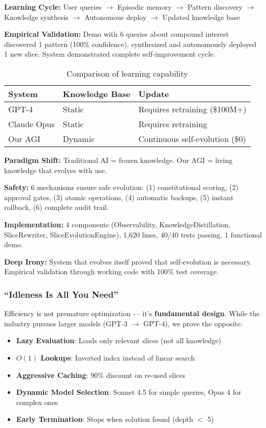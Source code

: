 \documentclass[11pt]{article}
\begin{document}
\textbf{Learning Cycle:} User queries $\rightarrow$ Episodic memory $\rightarrow$ Pattern discovery $\rightarrow$ Knowledge synthesis $\rightarrow$ Autonomous deploy $\rightarrow$ Updated knowledge base

\textbf{Empirical Validation:} Demo with 6 queries about compound interest discovered 1 pattern (100\% confidence), synthesized and autonomously deployed 1 new slice. System demonstrated complete self-improvement cycle.

\begin{table}[H]
\centering
\begin{tabular}{@{}lll@{}}
\toprule
\textbf{System} & \textbf{Knowledge Base} & \textbf{Update} \\ \midrule
GPT-4 & Static & Requires retraining (\$100M+) \\
Claude Opus & Static & Requires retraining \\
Our AGI & Dynamic & Continuous self-evolution (\$0) \\ \bottomrule
\end{tabular}
\caption{Comparison of learning capability}
\end{table}

\textbf{Paradigm Shift:} Traditional AI = frozen knowledge. Our AGI = living knowledge that evolves with use.

\textbf{Safety:} 6 mechanisms ensure safe evolution: (1) constitutional scoring, (2) approval gates, (3) atomic operations, (4) automatic backups, (5) instant rollback, (6) complete audit trail.

\textbf{Implementation:} 4 components (Observability, KnowledgeDistillation, SliceRewriter, SliceEvolutionEngine), 1,620 lines, 40/40 tests passing, 1 functional demo.

\textbf{Deep Irony:} System that evolves itself proved that self-evolution is necessary. Empirical validation through working code with 100\% test coverage.

\subsubsection{``Idleness Is All You Need''}

Efficiency is not premature optimization --- it's \textbf{fundamental design}. While the industry pursues larger models (GPT-3 $\rightarrow$ GPT-4), we prove the opposite:

\begin{itemize}
    \item \textbf{Lazy Evaluation}: Loads only relevant slices (not all knowledge)
    \item \textbf{$O(1)$ Lookups}: Inverted index instead of linear search
    \item \textbf{Aggressive Caching}: 90\% discount on re-used slices
    \item \textbf{Dynamic Model Selection}: Sonnet 4.5 for simple queries, Opus 4 for complex ones
    \item \textbf{Early Termination}: Stops when solution found (depth $<$ 5)
\end{itemize}
\end{document}
